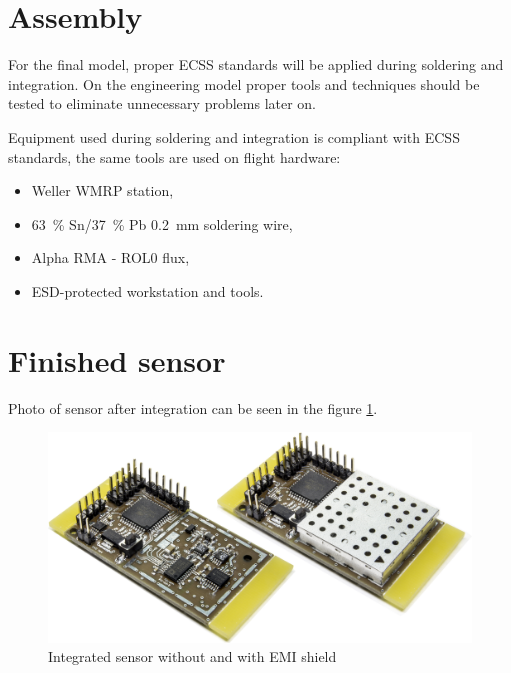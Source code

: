 \section{Assembly}
    For the final model, proper ECSS standards will be applied during soldering and integration. On the engineering model proper tools and techniques should be tested to eliminate unnecessary problems later on.

    Equipment used during soldering and integration is compliant with ECSS standards, the same tools are used on flight hardware:
    \begin{itemize}
        \item Weller WMRP station,
        \item \SI{63}{\percent} Sn/\SI{37}{\percent} Pb \SI{0.2}{\milli\meter} soldering wire,
        \item Alpha RMA - ROL0 flux,
        \item ESD-protected workstation and tools.
    \end{itemize}

\section{Finished sensor}
    Photo of sensor after integration can be seen in the figure \ref{Integrated_sensor}.

    \begin{figure}[H]
        \centering
        \includegraphics[width=0.8\paperwidth]{img/06/finishiedSensorPhoto.jpg}
        \caption{Integrated sensor without and with EMI shield}
        \label{Integrated_sensor}
    \end{figure}
